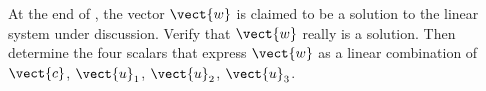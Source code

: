 At the end of , the vector $\vect{w}$ is claimed to be a solution to the linear system under discussion.  Verify that $\vect{w}$ really is a solution.  Then determine the four scalars that express $\vect{w}$ as a linear combination of $\vect{c}$, $\vect{u}_1$, $\vect{u}_2$, $\vect{u}_3$.